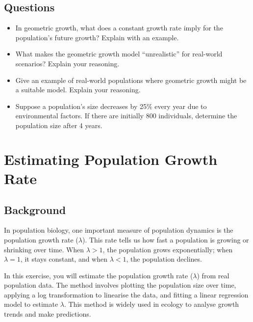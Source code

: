 \documentclass[
  a4paper]{book}
\providecommand{\tightlist}{%
  \setlength{\itemsep}{0pt}\setlength{\parskip}{0pt}}
\begin{document}
\section{Questions}\label{questions-2}

\begin{itemize}
\tightlist
\item
  In geometric growth, what does a constant growth rate imply for the population's future growth? Explain with an example.
\item
  What makes the geometric growth model ``unrealistic'' for real-world scenarios? Explain your reasoning.
\item
  Give an example of real-world populations where geometric growth might be a suitable model. Explain your reasoning.
\item
  Suppose a population's size decreases by 25\% every year due to environmental factors. If there are initially 800 individuals, determine the population size after 4 years.
\end{itemize}

\chapter{Estimating Population Growth Rate}\label{estimating-population-growth-rate}

\section{Background}\label{background-3}

In population biology, one important measure of population dynamics is the population growth rate (\(\lambda\)). This rate tells us how fast a population is growing or shrinking over time. When \(\lambda > 1\), the population grows exponentially; when \(\lambda = 1\), it stays constant, and when \(\lambda < 1\), the population declines.

In this exercise, you will estimate the population growth rate (\(\lambda\)) from real population data. The method involves plotting the population size over time, applying a log transformation to linearise the data, and fitting a linear regression model to estimate \(\lambda\). This method is widely used in ecology to analyse growth trends and make predictions.
\end{document}
